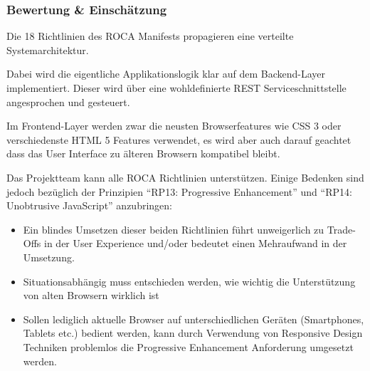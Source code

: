 \subsubsection*{Bewertung \& Einschätzung}
Die 18 Richtlinien des ROCA Manifests \cite{ROCA} propagieren eine verteilte Systemarchitektur.

Dabei wird die eigentliche Applikationslogik klar auf dem Backend-Layer implementiert. Dieser wird über eine wohldefinierte REST Serviceschnittstelle  angesprochen und gesteuert.

Im Frontend-Layer werden zwar die neusten Browserfeatures wie CSS 3 oder verschiedenste HTML 5 Features verwendet, es wird aber auch darauf geachtet dass das User Interface zu älteren Browsern kompatibel bleibt.

Das Projektteam kann alle ROCA Richtlinien unterstützen. Einige Bedenken sind jedoch bezüglich der Prinzipien ``RP13: Progressive Enhancement'' und ``RP14: Unobtrusive JavaScript'' anzubringen:

\begin{itemize}
	\item Ein blindes Umsetzen dieser beiden Richtlinien führt unweigerlich zu Trade-Offs in der User Experience und/oder bedeutet einen Mehraufwand in der Umsetzung.
	\item Situationsabhängig muss entschieden werden, wie wichtig die Unterstützung von alten Browsern wirklich ist
	\item Sollen lediglich aktuelle Browser auf unterschiedlichen Geräten (Smartphones, Tablets etc.) bedient werden, kann durch Verwendung von Responsive Design Techniken \cite{ResponsiveDesign} problemlos die Progressive Enhancement Anforderung umgesetzt werden.
\end{itemize}